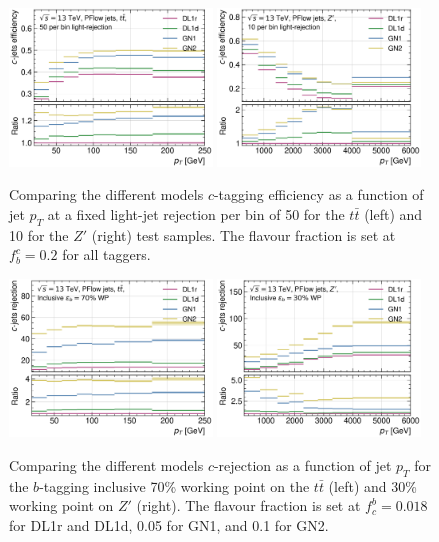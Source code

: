 \begin{figure}[h!]
    \centering
    \includegraphics[width=0.48\textwidth]{Images/FTAG/GN/GN2/pt_plots/pt_ttbar_c_eff_fixedlight.png}
    \includegraphics[width=0.48\textwidth]{Images/FTAG/GN/GN2/pt_plots/pt_zp_c_eff_fixedlight.png}
    \caption{Comparing the different models $c$-tagging efficiency as a function of jet $p_T$ at a fixed light-jet rejection per bin of 50 for the $t\bar{t}$ (left) and 10 for the $Z'$ (right) test samples. The flavour fraction is set at $f^c_b = 0.2$ for all taggers.}
    \label{apfig:GNxptc_efffixedl}
  \end{figure} 

\begin{figure}[h!]
    \centering
    \includegraphics[width=0.48\textwidth]{Images/FTAG/GN/GN2/pt_plots/pt_ttbar_c_rej.png}
    \includegraphics[width=0.48\textwidth]{Images/FTAG/GN/GN2/pt_plots/pt_zp_c_rej.png}
    \caption{Comparing the different models $c$-rejection as a function of jet $p_T$ for the $b$-tagging inclusive 70\% working point on the $t\bar{t}$ (left) and 30\% working point on $Z'$ (right). The flavour fraction is set at $f^b_c = 0.018$ for DL1r and DL1d, 0.05 for GN1, and 0.1 for GN2.}
    \label{apfig:GNxptb_crej}
  \end{figure} 
  
